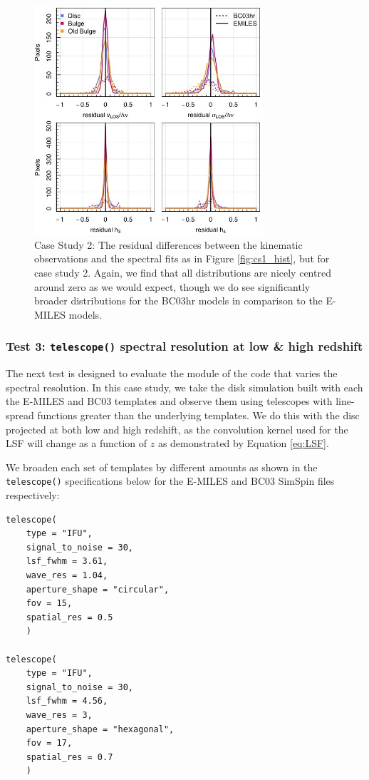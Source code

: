\documentclass[
  journal=pasa,
  manuscript=research-paper, %
  year=2020,
  volume=37,
]{cup-journal}
\newcommand{\telescope}[1]{\texttt{telescope()}#1}
\begin{document}
\begin{figure}
    \centering
    \includegraphics[keepaspectratio, width=8.5cm]{cs2_histograms.jpeg}
    \caption{Case Study 2: The residual differences between the kinematic observations and the spectral fits as in Figure \ref{fig:cs1_hist}, but for case study 2. Again, we find that all distributions are nicely centred around zero as we would expect, though we do see significantly broader distributions for the BC03hr models in comparison to the E-MILES models.}
    \label{fig:cs2_hist}
\end{figure}

\subsubsection*{Test 3: \telescope{} spectral resolution at low \& high redshift}

The next test is designed to evaluate the module of the code that varies the spectral resolution. 
In this case study, we take the disk simulation built with each the E-MILES and \textsc{BC03} templates and observe them using telescopes with line-spread functions greater than the underlying templates. 
We do this with the disc projected at both low and high redshift, as the convolution kernel used for the LSF will change as a function of $z$ as demonstrated by Equation \ref{eq:LSF}.

We broaden each set of templates by different amounts as shown in the \telescope{} specifications below for the E-MILES and BC03 SimSpin files respectively:
\begin{lstlisting}[basicstyle=\fontsize{10}{8}\selectfont\ttfamily]
telescope(
    type = "IFU", 
    signal_to_noise = 30, 
    lsf_fwhm = 3.61, 
    wave_res = 1.04,
    aperture_shape = "circular", 
    fov = 15,
    spatial_res = 0.5
    )

telescope(
    type = "IFU", 
    signal_to_noise = 30, 
    lsf_fwhm = 4.56,
    wave_res = 3, 
    aperture_shape = "hexagonal",
    fov = 17,
    spatial_res = 0.7
    )
\end{lstlisting}
\end{document}
